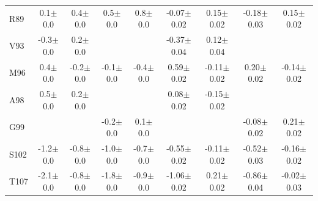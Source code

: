 \documentclass[%
 aip,
 amsmath,amssymb,
 preprint,%
]{revtex4-1}
\begin{document}
\begin{center}
\begin{longtable}{l|c|c|c|c|c|c|c|c}
R89 & 0.1$\pm$0.0 & 0.4$\pm$0.0 & 0.5$\pm$0.0 & 0.8$\pm$0.0 & -0.07$\pm$0.02 & 0.15$\pm$0.02 & -0.18$\pm$0.03 & 0.15$\pm$0.02 \\
V93 & -0.3$\pm$0.0 & 0.2$\pm$0.0 & & & -0.37$\pm$0.04 & 0.12$\pm$0.04 & & \\
M96 & 0.4$\pm$0.0 & -0.2$\pm$0.0 & -0.1$\pm$0.0 & -0.4$\pm$0.0 & 0.59$\pm$0.02 & -0.11$\pm$0.02 & 0.20$\pm$0.02 & -0.14$\pm$0.02 \\
A98 & 0.5$\pm$0.0 & 0.2$\pm$0.0 & & & 0.08$\pm$0.02 & -0.15$\pm$0.02 & & \\
G99 & & & -0.2$\pm$0.0 & 0.1$\pm$0.0 & & & -0.08$\pm$0.02 & 0.21$\pm$0.02 \\
S102 & -1.2$\pm$0.0 & -0.8$\pm$0.0 & -1.0$\pm$0.0 & -0.7$\pm$0.0 & -0.55$\pm$0.02 & -0.11$\pm$0.02 & -0.52$\pm$0.03 & -0.16$\pm$0.02 \\
T107 & -2.1$\pm$0.0 & -0.8$\pm$0.0 & -1.8$\pm$0.0 & -0.9$\pm$0.0 & -1.06$\pm$0.02 & 0.21$\pm$0.02 & -0.86$\pm$0.04 & -0.02$\pm$0.03 \\
\end{longtable}
\end{center}
\endgroup
\end{document}
